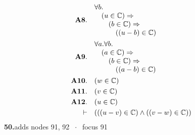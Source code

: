 \documentclass[11pt]{article}
\theoremstyle{plain}
\newcommand{\fit}[1]{\resizebox{\ifdim\width>\linewidth\linewidth\else\width\fi}{!}{#1}}
\begin{document}
\begin{align*}
  \mathbf{A8.}\quad & \begin{array}{@{}l@{}} \forall b. \\ \quad (u \in \mathbb{C}) \Rightarrow  \\ \quad \quad (b \in \mathbb{C}) \Rightarrow  \\ \quad \quad \quad ((u - b) \in \mathbb{C}) \end{array} \\
  \mathbf{A9.}\quad & \begin{array}{@{}l@{}} \forall a. \forall b. \\ \quad (a \in \mathbb{C}) \Rightarrow  \\ \quad \quad (b \in \mathbb{C}) \Rightarrow  \\ \quad \quad \quad ((a - b) \in \mathbb{C}) \end{array} \\
  \mathbf{A10.}\quad & (w \in \mathbb{C}) \\
  \mathbf{A11.}\quad & (v \in \mathbb{C}) \\
  \mathbf{A12.}\quad & (u \in \mathbb{C}) \\
  \vdash\quad & (((u - v) \in \mathbb{C}) \wedge ((v - w) \in \mathbb{C}))
\end{align*}
\medskip\noindent\textbf{50.}\quad \fit{\texttt{(di)}}\hfill{\small adds nodes 91, 92 $\;\cdot\;$ focus 91}\\[2pt]
\end{document}
